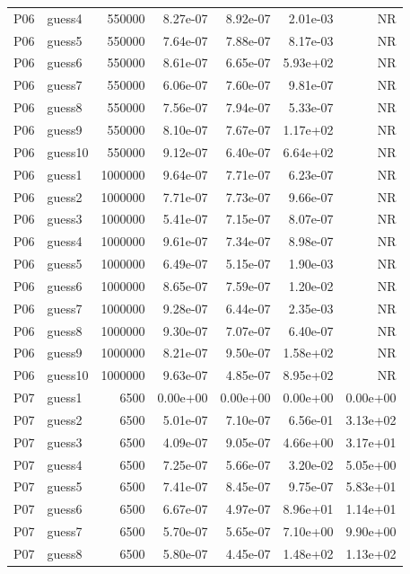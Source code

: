 {\begin{longtable}{llrrrrr}
P06 & guess4 & 550000 & 8.27e-07 & 8.92e-07 & 2.01e-03 & NR \\
P06 & guess5 & 550000 & 7.64e-07 & 7.88e-07 & 8.17e-03 & NR \\
P06 & guess6 & 550000 & 8.61e-07 & 6.65e-07 & 5.93e+02 & NR \\
P06 & guess7 & 550000 & 6.06e-07 & 7.60e-07 & 9.81e-07 & NR \\
P06 & guess8 & 550000 & 7.56e-07 & 7.94e-07 & 5.33e-07 & NR \\
P06 & guess9 & 550000 & 8.10e-07 & 7.67e-07 & 1.17e+02 & NR \\
P06 & guess10 & 550000 & 9.12e-07 & 6.40e-07 & 6.64e+02 & NR \\
P06 & guess1 & 1000000 & 9.64e-07 & 7.71e-07 & 6.23e-07 & NR \\
P06 & guess2 & 1000000 & 7.71e-07 & 7.73e-07 & 9.66e-07 & NR \\
P06 & guess3 & 1000000 & 5.41e-07 & 7.15e-07 & 8.07e-07 & NR \\
P06 & guess4 & 1000000 & 9.61e-07 & 7.34e-07 & 8.98e-07 & NR \\
P06 & guess5 & 1000000 & 6.49e-07 & 5.15e-07 & 1.90e-03 & NR \\
P06 & guess6 & 1000000 & 8.65e-07 & 7.59e-07 & 1.20e-02 & NR \\
P06 & guess7 & 1000000 & 9.28e-07 & 6.44e-07 & 2.35e-03 & NR \\
P06 & guess8 & 1000000 & 9.30e-07 & 7.07e-07 & 6.40e-07 & NR \\
P06 & guess9 & 1000000 & 8.21e-07 & 9.50e-07 & 1.58e+02 & NR \\
P06 & guess10 & 1000000 & 9.63e-07 & 4.85e-07 & 8.95e+02 & NR \\
P07 & guess1 & 6500 & 0.00e+00 & 0.00e+00 & 0.00e+00 & 0.00e+00 \\
P07 & guess2 & 6500 & 5.01e-07 & 7.10e-07 & 6.56e-01 & 3.13e+02 \\
P07 & guess3 & 6500 & 4.09e-07 & 9.05e-07 & 4.66e+00 & 3.17e+01 \\
P07 & guess4 & 6500 & 7.25e-07 & 5.66e-07 & 3.20e-02 & 5.05e+00 \\
P07 & guess5 & 6500 & 7.41e-07 & 8.45e-07 & 9.75e-07 & 5.83e+01 \\
P07 & guess6 & 6500 & 6.67e-07 & 4.97e-07 & 8.96e+01 & 1.14e+01 \\
P07 & guess7 & 6500 & 5.70e-07 & 5.65e-07 & 7.10e+00 & 9.90e+00 \\
P07 & guess8 & 6500 & 5.80e-07 & 4.45e-07 & 1.48e+02 & 1.13e+02 \\

\end{longtable}}
